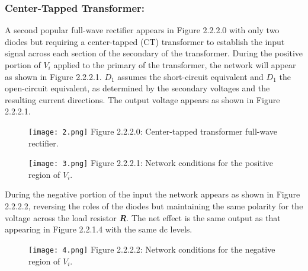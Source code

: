 \subsubsection{Center-Tapped Transformer:}

A second popular full-wave rectifier appears in Figure 2.2.2.0 with only two diodes but
requiring a center-tapped (CT) transformer to establish the input signal across each
section of the secondary of the transformer. During the positive portion of $V_{i}$ applied
to the primary of the transformer, the network will appear as shown in Figure 2.2.2.1. $D_{1}$
assumes the short-circuit equivalent and $D_{1}$ the open-circuit equivalent, as determined
by the secondary voltages and the resulting current directions. The output voltage appears
as shown in Figure 2.2.2.1.

\begin{multicols}{2}
\begin{figure}[H]
\texttt{[image: 2.png]}
\centering \linebreak \linebreak Figure 2.2.2.0: Center-tapped transformer full-wave rectifier.
\end{figure}

\begin{figure}[H]
\texttt{[image: 3.png]}
\centering \linebreak \linebreak Figure 2.2.2.1: Network conditions for the positive region of $V_{i}$.
\end{figure}
\end{multicols}

\begin{multicols}{2}
During the negative portion of the input the network appears as shown in Figure 2.2.2.2, reversing the roles of the diodes but maintaining the same polarity for the voltage across the load resistor {\bfseries\itshape R}. The net effect is the same output as that appearing in Figure 2.2.1.4 with the same dc levels.

\begin{figure}[H]
\texttt{[image: 4.png]}
\centering \linebreak \linebreak Figure 2.2.2.2: Network conditions for the negative region of $V_{i}$.
\end{figure}
\end{multicols}

\pagebreak